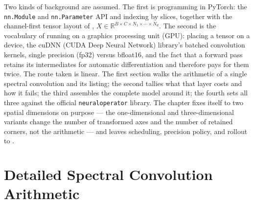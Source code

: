 Two kinds of background are assumed. The first is programming in PyTorch: the
\texttt{nn.Module} and \texttt{nn.Parameter} API and indexing by slices,
together with the channel-first tensor layout of
,
$X \in \mathbb{R}^{B \times C \times N_1 \times \cdots \times N_d}$.
The second is the vocabulary of running on a graphics processing unit (GPU):
placing a tensor on a device, the cuDNN (CUDA Deep Neural Network) library's
batched convolution kernels, single precision (fp32) versus bfloat16, and the
fact that a forward pass retains its intermediates for automatic differentiation
and therefore pays for them twice.
The route taken is linear. The first section walks the arithmetic of a single
spectral convolution and its listing; the second tallies what that layer costs
and how it fails; the third assembles the complete model around it; the fourth
sets all three against the official \texttt{neuraloperator} library. The chapter
fixes itself to two spatial dimensions on purpose --- the
one-dimensional and three-dimensional variants change the number of transformed
axes and the number of retained corners, not the arithmetic --- and leaves
scheduling, precision policy, and rollout to
.

\section{Detailed Spectral Convolution Arithmetic}
\label{sec:ch23-spectral-arithmetic}

